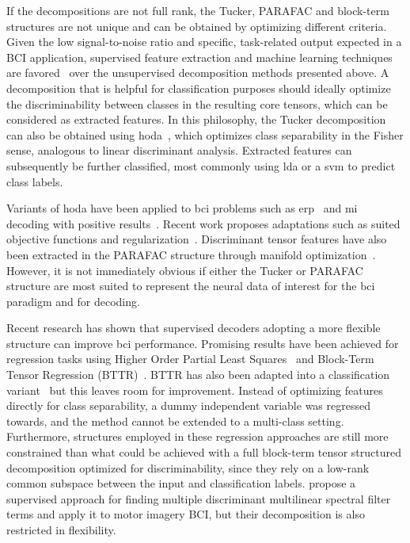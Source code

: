 If the decompositions are not full rank, the Tucker, PARAFAC and block-term
structures are not unique and can be obtained by optimizing different criteria.
Given the low signal-to-noise ratio and specific, task-related output expected
in a BCI application, supervised feature extraction and machine learning techniques are
favored~\cite{Lotte2018} over the unsupervised decomposition methods presented
above.
A decomposition that is helpful for classification purposes should ideally optimize
the discriminability between classes in the resulting core tensors, which can
be considered as extracted features.
In this philosophy, the Tucker decomposition can also be obtained
using \ac{hoda}~\cite{Yan2005,Phan2010,Froelich2018}, which optimizes class separability in the Fisher sense, analogous to linear
discriminant analysis.
Extracted features can subsequently be further classified, most commonly
using \ac{lda} or a \ac{svm} to predict class labels.

Variants of \ac{hoda} have been applied to \ac{bci} problems such as
\ac{erp}~\cite{Onishi2012,Higashi2016} and \ac{mi}~\cite{Liu2015,Cai2021}
decoding with positive results~\cite{Lotte2018}.
Recent work proposes adaptations such as suited objective
functions and regularization~\cite{JamshidiIdaji2017,Jorajuria2022,Aghili2023}.
Discriminant tensor features have also been extracted
in the PARAFAC structure through manifold optimization~\cite{Froelich2018}.
However, it is not immediately obvious if either the Tucker or PARAFAC
structure are most suited to represent the neural data of interest for the
\ac{bci}
paradigm and for decoding.

Recent research has shown that supervised decoders adopting a more flexible structure
can improve \ac{bci} performance.
Promising results have been achieved for regression tasks using
Higher Order Partial Least Squares~\cite{Camarrone2018} and Block-Term Tensor
Regression (BTTR)~\cite{Faes2022,Faes2022a}.
BTTR has also been adapted into a classification variant~\cite{Camarrone2021}
but this leaves room for improvement.
Instead of optimizing features directly for class separability, a dummy
independent variable was regressed towards, and the method
cannot be extended to a multi-class setting.
Furthermore, structures employed in these regression approaches are still more constrained
than what could be achieved with a full block-term tensor structured decomposition
optimized for discriminability, since they rely on a low-rank common subspace
between the input and classification labels.
\textcite{Huang2020} propose a supervised approach for finding multiple discriminant
multilinear spectral filter terms and apply it to motor imagery BCI, but their
decomposition is also restricted in flexibility.


